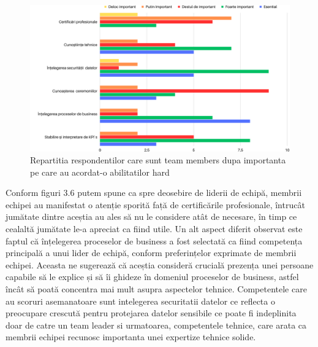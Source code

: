 \documentclass[a4paper, 12pt]{article}
\begin{document}
	


		\begin{figure}[!htb]
			\centering
			\includegraphics[width=17cm, height=12 cm]{"figures/team members (1).png"}
			\caption {Repartitia respondentilor care sunt team members dupa importanta pe care au acordat-o abilitatilor hard}\label{fig:four}
			
		\end{figure}

		\quad Conform figuri 3.6 putem spune ca spre deosebire de liderii de echipă, membrii echipei au manifestat o atenție sporită față de certificările profesionale, întrucât jumătate dintre aceștia au ales să nu le considere atât de necesare, în timp ce cealaltă jumătate le-a apreciat ca fiind utile. Un alt aspect diferit observat este faptul că înțelegerea proceselor de business a fost selectată ca fiind competența principală a unui lider de echipă, conform preferințelor exprimate de membrii echipei. Aceasta ne sugerează că aceștia consideră crucială prezența unei persoane capabile să le explice și să îi ghideze în domeniul proceselor de business, astfel încât să poată concentra mai mult asupra aspectelor tehnice. Competentele  care au scoruri asemanatoare sunt intelegerea securitatii datelor ce reflecta o preocupare crescută pentru protejarea datelor sensibile ce poate fi indeplinita doar de catre un team leader si urmatoarea, competentele tehnice, care arata ca membrii echipei recunosc importanta unei expertize tehnice solide.
\newpage
\end{document}

